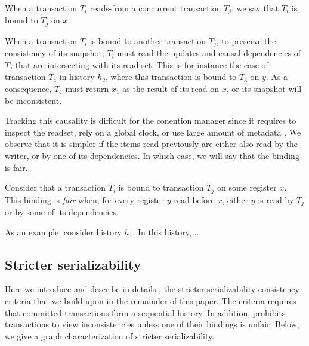\begin{definition}[Binding]
  When a transaction $T_i$ reads-from a concurrent transaction $T_j$, we say that $T_i$ is bound to $T_j$ on $x$.
\end{definition}

When a transaction $T_i$ is bound to another transaction $T_j$, to preserve the consistency of its snapshot, $T_i$ must read the updates and causal dependencies of $T_j$ that are intersecting with its read set.
This is for instance the case of transaction $T_4$ in history $h_2$, where this transaction is bound to $T_3$ on $y$.
As a consequence, $T_4$ must return $x_1$ as the result of its read on $x$, or its snapshot will be inconsistent.

Tracking this causality is difficult for the conention manager since it requires to inspect the readset, rely on a global clock, or use large amount of metadata \cite{}.
We observe that it is simpler if the items read previously are either also read by the writer, or by one of its dependencies.
In which case, we will say that the binding is fair.

\begin{definition}
  Consider that a transaction $T_i$ is bound to transaction $T_j$ on some register $x$.
  This binding is \emph{fair} when, for every register $y$ read before $x$, either $y$ is read by $T_j$ or by some of its dependencies.
\end{definition}

As an example, consider history $h_1$.
In this history, ...


\subsection{Stricter serializability}
Here we introduce and describe in details \sser, the stricter serializability consistency criteria that we build upon in the remainder of this paper.
The \sser criteria requires that committed transactions form a sequential history.
In addition, \sser prohibits transactions to view inconsistencies unless one of their bindings is unfair.
Below, we give a graph characterization of stricter serializability.


